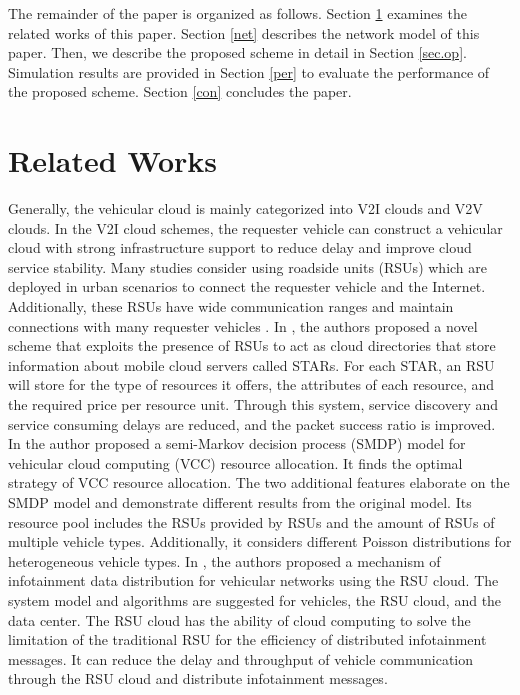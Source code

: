 \documentclass[electronics,aricle,accept,pdftex,moreauthors]{Definitions/mdpi}
\begin{document}
The remainder of the paper is organized as follows. Section \ref{rel} examines the related works of this paper. Section \ref{net} describes the network model of this paper. Then, we describe the proposed scheme in detail in Section \ref{sec.op}. Simulation results are provided in Section \ref{per} to evaluate the performance of the proposed scheme. Section \ref{con} concludes the paper.


\section{Related Works} \label{rel}
Generally, the vehicular cloud is mainly categorized into V2I clouds and V2V clouds. In the V2I cloud schemes, the requester vehicle can construct a vehicular cloud with strong infrastructure support to reduce delay and improve cloud service stability. Many studies consider using roadside units (RSUs) which are deployed in urban scenarios to connect the requester vehicle and the Internet. Additionally, these RSUs have wide communication ranges and maintain connections with many requester vehicles \cite{Abdelhamid2017,Mershad2013,Jaiboon2017,Lin2017,Elahi2021,Rahman2018}.
In \cite{Mershad2013}, the authors proposed a novel scheme that exploits the presence of RSUs to act as cloud directories that store information about mobile cloud servers called STARs. For each STAR, an RSU will store for the type of resources it offers, the attributes of each resource, and the required price per resource unit. Through this system, service discovery and service consuming delays are reduced, and the packet success ratio is improved.
In \cite{Lin2017} the author proposed a semi-Markov decision process (SMDP) model for vehicular cloud computing (VCC) resource allocation. It finds the optimal strategy of VCC resource allocation. The two additional features elaborate on the SMDP model and demonstrate different results from the original model. Its resource pool includes the RSUs provided by RSUs and the amount of RSUs of multiple vehicle types. Additionally, it considers different Poisson distributions for heterogeneous vehicle types.
In \cite{Jaiboon2017}, the authors proposed a mechanism of infotainment data distribution for vehicular networks using the RSU cloud. The system model and algorithms are suggested for vehicles, the RSU cloud, and the data center. The RSU cloud has the ability of cloud computing to solve the limitation of the traditional RSU for the efficiency of distributed infotainment messages. It can reduce the delay and throughput of vehicle communication through the RSU cloud and distribute infotainment messages.
\end{document}
